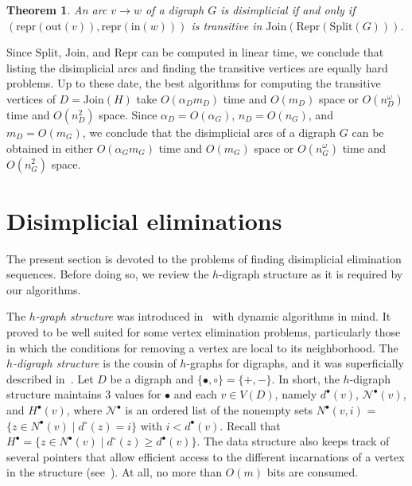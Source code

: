 \documentclass[a4paper,11pt]{article}
\newtheorem{theorem}{Theorem}
\newcommand{\SPLIT}{\ensuremath{\mathrm{Split}}}
\newcommand{\JOIN}{\ensuremath{\mathrm{Join}}}
\newcommand{\IN}{\ensuremath{\mathrm{in}}}
\newcommand{\OUT}{\ensuremath{\mathrm{out}}}
\newcommand{\REPG}{\ensuremath{\mathrm{Repr}}}
\newcommand{\REP}{\ensuremath{\mathrm{repr}}}
\begin{document}
\begin{theorem}\label{thm:disimplicial algorithm}
  An arc $v \to w$ of a digraph $G$ is disimplicial if and only if\/ $(\REP(\OUT(v)), \REP(\IN(w)))$ is transitive in\/ $\JOIN(\REPG(\SPLIT(G)))$.
\end{theorem}

Since $\SPLIT$, $\JOIN$, and $\REPG$ can be computed in linear time, we conclude that listing the disimplicial arcs and finding the transitive vertices are equally hard problems. Up to these date, the best algorithms for computing the transitive vertices of $D = \JOIN(H)$ take $O(\alpha_D m_D)$ time and $O(m_D)$ space or $O(n_D^\omega)$ time and $O(n_D^2)$ space. Since $\alpha_D = O(\alpha_G)$, $n_D = O(n_G)$, and $m_D = O(m_G)$, we conclude that the disimplicial arcs of a digraph $G$ can be obtained in either $O(\alpha_G m_G)$ time and $O(m_G)$ space or $O(n_G^\omega)$ time and $O(n_G^2)$ space.

\section{Disimplicial eliminations}
\label{sec:disimplicial elimination}

The present section is devoted to the problems of finding disimplicial elimination sequences.  Before doing so, we review the $h$-digraph structure as it is required by our algorithms.

The \emph{$h$-graph structure} was introduced in~\cite{LinSoulignacSzwarcfiterTCS2012} with dynamic algorithms in mind.  It proved to be well suited for some vertex elimination problems, particularly those in which the conditions for removing a vertex are local to its neighborhood.  The \emph{$h$-digraph structure} is the cousin of $h$-graphs for digraphs, and it was superficially described in~\cite{LinSoulignacSzwarcfiterTCS2012}.  Let $D$ be a digraph and $\{\bullet, \circ\} = \{+,-\}$.  In short, the $h$-digraph structure maintains $3$ values for $\bullet$ and each $v \in V(D)$, namely $d^\bullet(v)$, $\mathcal{N}^\bullet(v)$, and $H^\bullet(v)$, where $\mathcal{N}^\bullet$ is an ordered list of the nonempty sets $N^\bullet(v, i)$ = $\{z \in N^\bullet(v) \mid d^\circ(z) = i\}$ with $i < d^\bullet(v)$.  Recall that $H^\bullet = \{z \in N^\bullet(v) \mid d^\circ(z) \geq d^\bullet(v)\}$.    The data structure also keeps track of several pointers that allow efficient access to the different incarnations of a vertex in the structure (see~\cite{LinSoulignacSzwarcfiterTCS2012}).  At all, no more than $O(m)$ bits are consumed.
\end{document}
